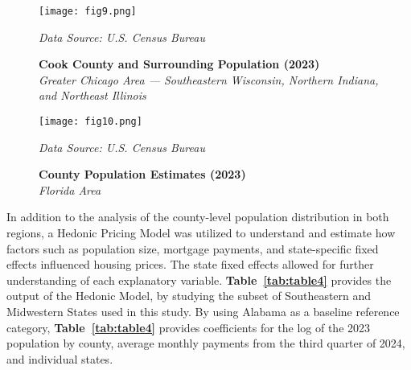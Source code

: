 \documentclass[journal,article,submit,pdftex,moreauthors]{Definitions/mdpi}
\begin{document}
\begin{figure}[H]
  \centering
  \texttt{[image: fig9.png]}
  \caption{\textbf{Cook County and Surrounding Population (2023)}\\\textit{Greater Chicago Area — Southeastern Wisconsin, Northern Indiana, and Northeast Illinois}}
  \label{fig:figure9}
  \vspace{1ex}
  {\footnotesize\textit{Data Source: U.S. Census Bureau}}
\end{figure}

\begin{figure}[H]
  \centering
  \texttt{[image: fig10.png]}
  \caption{\textbf{County Population Estimates (2023)}\\\textit{Florida Area}}
  \label{fig:figure10}
  \vspace{1ex}
  {\footnotesize\textit{Data Source: U.S. Census Bureau}}
\end{figure}
 
In addition to the analysis of the county-level population distribution in both regions, a Hedonic Pricing Model was utilized to understand and estimate how factors such as population size, mortgage payments, and state-specific fixed effects influenced housing prices. The state fixed effects allowed for further understanding of each explanatory variable. \textbf{Table~\ref{tab:table4}} provides the output of the Hedonic Model, by studying the subset of Southeastern and Midwestern States used in this study. By using Alabama as a baseline reference category, \textbf{Table~\ref{tab:table4}} provides coefficients for the log of the 2023 population by county, average monthly payments from the third quarter of 2024, and individual states.
\end{document}
